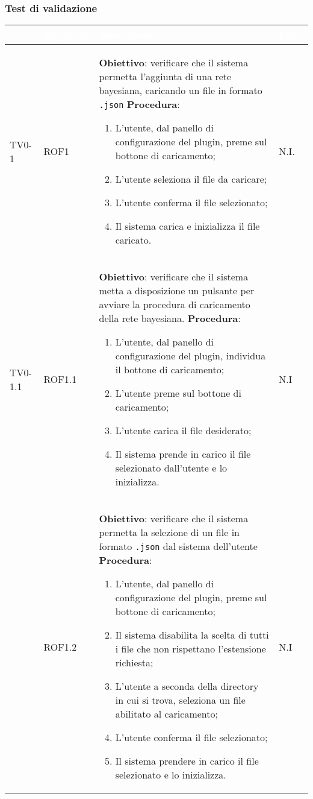\subsubsection{Test di validazione}

\begin{longtable}{|C{.10\textwidth}|C{.12\textwidth}|C{.52\textwidth}|C{.12\textwidth}|}
\hline
{}\textbf{\textcolor{white}{Test}} & \textbf{\textcolor{white}{Requisito}} & \textbf{\textcolor{white}{Descrizione}} & \textbf{\textcolor{white}{Esito}}\\
\hline \hline
\endhead

TV0-1 & ROF1 & 
	\textbf{Obiettivo}: verificare che il sistema permetta l'aggiunta di una rete bayesiana, caricando un file in formato \texttt{.json}
	\textbf{Procedura}: 
	\begin{enumerate}
		\item L'utente, dal panello di configurazione del plugin, preme sul bottone di caricamento; 
		\item L'utente seleziona il file da caricare; 
		\item L'utente conferma il file selezionato; 
		\item Il sistema carica e inizializza il file caricato. 
	\end{enumerate} & N.I. \\
\hline
{} TV0-1.1 & ROF1.1 & 
	\textbf{Obiettivo}: verificare che il sistema metta a disposizione un pulsante per avviare la procedura di caricamento della rete bayesiana. 
	\textbf{Procedura}: 
	\begin{enumerate}
		\item L'utente, dal panello di configurazione del plugin, individua il bottone di caricamento; 
		\item L'utente preme sul bottone di caricamento; 
		\item L'utente carica il file desiderato; 
		\item Il sistema prende in carico il file selezionato dall'utente e lo inizializza. 
	\end{enumerate}
	& N.I \\
\hline
{}   & ROF1.2 &
	\textbf{Obiettivo}: verificare che il sistema permetta la selezione di un file in formato \texttt{.json} dal sistema dell'utente 
	\textbf{Procedura}:
	\begin{enumerate}
		\item L'utente, dal panello di configurazione del plugin, preme sul bottone di caricamento; 
		\item Il sistema disabilita la scelta di tutti i file che non rispettano l'estensione richiesta; 
		\item L'utente a seconda della directory in cui si trova, seleziona un file abilitato al caricamento; 
		\item L'utente conferma il file selezionato; 
		\item Il sistema prendere in carico il file selezionato e  lo inizializza. 
	\end{enumerate}
	& N.I \\
\hline


\end{longtable}

